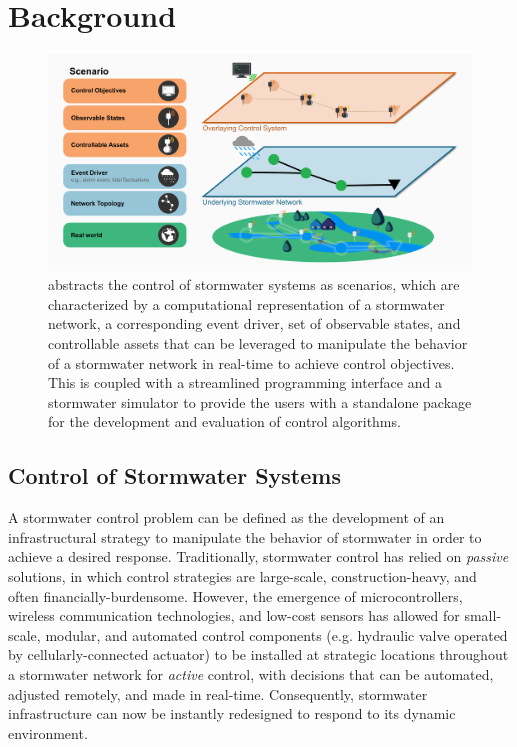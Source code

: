 \section{Background}
\label{sec:background}
%
%
%
\begin{figure}
    \centering
    \includegraphics[width=\linewidth]{gfx/Chapter-5/pystormsLayersSketch.png}
    \caption{\pystorms abstracts the control of stormwater systems as scenarios, which are characterized by a computational representation of a stormwater network, a corresponding event driver, set of observable states, and controllable assets that can be leveraged to manipulate the behavior of a stormwater network in real-time to achieve control objectives. This is coupled with a streamlined programming interface and a stormwater simulator to provide the users with a standalone package for the development and evaluation of control algorithms.}
    \label{fig:scenarioComponents}
\end{figure}
%
%
%
\subsection{Control of Stormwater Systems}
\label{subsec:controlofstormwatersystems}
%
%
%
A stormwater control problem can be defined as the development of an infrastructural strategy to manipulate the behavior of stormwater in order to achieve a desired response.
Traditionally, stormwater control has relied on \emph{passive} solutions, in which control strategies are large-scale, construction-heavy, and often financially-burdensome.
However, the emergence of microcontrollers, wireless communication technologies, and low-cost sensors has allowed for small-scale, modular, and automated control components (e.g. hydraulic valve operated by cellularly-connected actuator) to be installed at strategic locations throughout a stormwater network for \emph{active} control, with decisions that can be automated, adjusted remotely, and made in real-time.
Consequently, stormwater infrastructure can now be instantly redesigned to respond to its dynamic environment.

